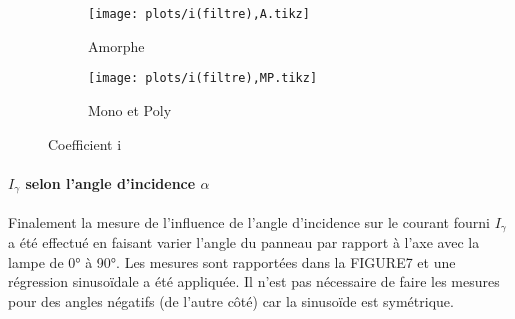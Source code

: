 \begin{figure}
    \centering
    \begin{subfigure}[t]{0.45\linewidth}
        \centering
        \texttt{[image: plots/i(filtre),A.tikz]}
        \caption{Amorphe}
        \label{plot:6a}
    \end{subfigure}
    \begin{subfigure}[t]{0.45\linewidth}
        \centering
        \texttt{[image: plots/i(filtre),MP.tikz]}
        \caption{Mono et Poly}
        \label{plot:6b}
    \end{subfigure}
    \caption{Coefficient i}
    \label{plot:6}
\end{figure}

\paragraph*{\(I_\gamma\) selon l'angle d'incidence \(\alpha\)}
Finalement la mesure de l'influence de l'angle d'incidence sur le courant fourni \(I_\gamma\) a été effectué en faisant varier l'angle du panneau par rapport à l'axe avec la lampe de 0° à 90°. Les mesures sont rapportées dans la FIGURE7 et une régression sinusoïdale a été appliquée. Il n'est pas nécessaire de faire les mesures pour des angles négatifs (de l'autre côté) car la sinusoïde est symétrique.






